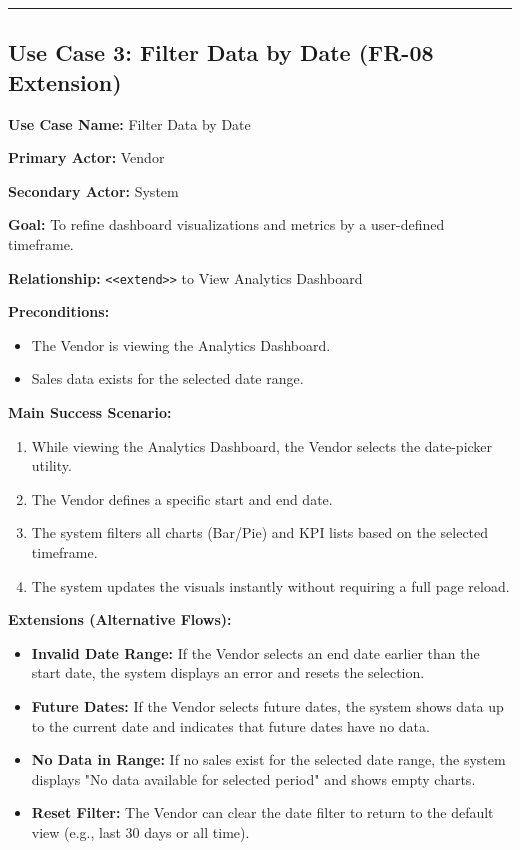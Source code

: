 \vspace{0.5cm}
\hrule
\vspace{0.5cm}

\subsection*{Use Case 3: Filter Data by Date (FR-08 Extension)}

\textbf{Use Case Name:} Filter Data by Date

\textbf{Primary Actor:} Vendor

\textbf{Secondary Actor:} System

\textbf{Goal:} To refine dashboard visualizations and metrics by a user-defined timeframe.

\textbf{Relationship:} \texttt{\textless\textless extend\textgreater\textgreater} to View Analytics Dashboard

\textbf{Preconditions:}
\begin{itemize}
    \item The Vendor is viewing the Analytics Dashboard.
    \item Sales data exists for the selected date range.
\end{itemize}

\textbf{Main Success Scenario:}
\begin{enumerate}
    \item While viewing the Analytics Dashboard, the Vendor selects the date-picker utility.
    \item The Vendor defines a specific start and end date.
    \item The system filters all charts (Bar/Pie) and KPI lists based on the selected timeframe.
    \item The system updates the visuals instantly without requiring a full page reload.
\end{enumerate}

\textbf{Extensions (Alternative Flows):}
\begin{itemize}
    \item[2a.] \textbf{Invalid Date Range:} If the Vendor selects an end date earlier than the start date, the system displays an error and resets the selection.
    
    \item[2b.] \textbf{Future Dates:} If the Vendor selects future dates, the system shows data up to the current date and indicates that future dates have no data.
    
    \item[3a.] \textbf{No Data in Range:} If no sales exist for the selected date range, the system displays "No data available for selected period" and shows empty charts.
    
    \item[4a.] \textbf{Reset Filter:} The Vendor can clear the date filter to return to the default view (e.g., last 30 days or all time).
\end{itemize}

